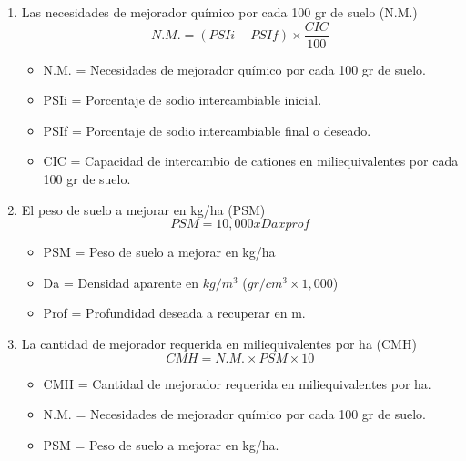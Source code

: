 \begin{enumerate}
    \item Las necesidades de mejorador químico por cada 100 gr de suelo (N.M.)
    \begin{equation}
        N.M. = (PSIi - PSIf) \times  \frac{CIC}{100}
    \end{equation}
    \begin{notation}
        \begin{itemize}
            \item N.M. = Necesidades de mejorador químico por cada 100 gr de suelo.
            \item PSIi = Porcentaje de sodio intercambiable inicial.
            \item PSIf = Porcentaje de sodio intercambiable final o deseado.
            \item CIC = Capacidad de intercambio de cationes en miliequivalentes por cada 100 gr de suelo.
        \end{itemize}
    \end{notation} 
    \item El peso de suelo a mejorar en kg/ha (PSM)
    \begin{equation}
        PSM = 10,000 x Da x prof 
    \end{equation}
    \begin{notation}
        \begin{itemize}
            \item PSM = Peso de suelo a mejorar en kg/ha
            \item Da = Densidad aparente en $kg/m^3$ ($gr/cm^3\times 1,000$)
            \item Prof = Profundidad deseada a recuperar en m.
        \end{itemize}
    \end{notation}
    \item La cantidad de mejorador requerida en miliequivalentes por ha (CMH)
    \begin{equation}
        CMH = N.M. \times  PSM \times  10
    \end{equation}
    \begin{notation}
        \begin{itemize}
            \item  CMH = Cantidad de mejorador requerida en miliequivalentes por ha.
            \item N.M. = Necesidades de mejorador químico por cada 100 gr de suelo.
            \item PSM = Peso de suelo a mejorar en kg/ha.

\end{itemize}
\end{notation}
\end{enumerate}
